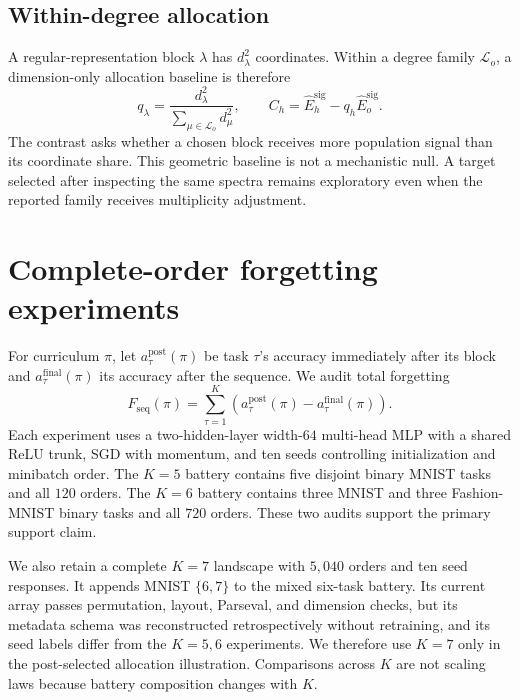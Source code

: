 \documentclass{article}
\newcommand{\Esig}{\widehat E^{\mathrm{sig}}}
\begin{document}
\subsection{Within-degree allocation}

A regular-representation block $\lambda$ has $d_\lambda^2$ coordinates. Within a degree family $\mathcal L_o$, a dimension-only allocation baseline is therefore
\begin{equation}
  q_\lambda=\frac{d_\lambda^2}{\sum_{\mu\in\mathcal L_o}d_\mu^2},
  \qquad C_h=\Esig_h-q_h\Esig_o.
  \label{eq:allocation}
\end{equation}
The contrast asks whether a chosen block receives more population signal than its coordinate share. This geometric baseline is not a mechanistic null. A target selected after inspecting the same spectra remains exploratory even when the reported family receives multiplicity adjustment.

\section{Complete-order forgetting experiments}

For curriculum $\pi$, let $a_\tau^{\mathrm{post}}(\pi)$ be task $\tau$'s accuracy immediately after its block and $a_\tau^{\mathrm{final}}(\pi)$ its accuracy after the sequence. We audit total forgetting
\begin{equation}
  F_{\mathrm{seq}}(\pi)=\sum_{\tau=1}^K\left(a_\tau^{\mathrm{post}}(\pi)-a_\tau^{\mathrm{final}}(\pi)\right).
  \label{eq:forgetting}
\end{equation}
Each experiment uses a two-hidden-layer width-$64$ multi-head MLP with a shared ReLU trunk, SGD with momentum, and ten seeds controlling initialization and minibatch order. The $K=5$ battery contains five disjoint binary MNIST tasks \citep{lecun1998gradient} and all $120$ orders. The $K=6$ battery contains three MNIST and three Fashion-MNIST \citep{xiao2017fashion} binary tasks and all $720$ orders. These two audits support the primary support claim.

We also retain a complete $K=7$ landscape with $5{,}040$ orders and ten seed responses. It appends MNIST $\{6,7\}$ to the mixed six-task battery. Its current array passes permutation, layout, Parseval, and dimension checks, but its metadata schema was reconstructed retrospectively without retraining, and its seed labels differ from the $K=5,6$ experiments. We therefore use $K=7$ only in the post-selected allocation illustration. Comparisons across $K$ are not scaling laws because battery composition changes with $K$.
\end{document}
